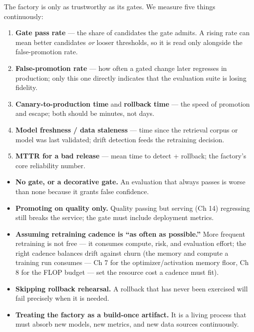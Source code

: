 The factory is only as trustworthy as its gates. We measure five things
continuously:

\begin{enumerate}
\def\labelenumi{\arabic{enumi}.}
\tightlist
\item
  \textbf{Gate pass rate} --- the share of candidates the gate admits. A
  rising rate can mean better candidates \emph{or} looser thresholds, so
  it is read only alongside the false-promotion rate.
\item
  \textbf{False-promotion rate} --- how often a gated change later
  regresses in production; only this one directly indicates that the
  evaluation suite is losing fidelity.
\item
  \textbf{Canary-to-production time} and \textbf{rollback time} --- the
  speed of promotion and escape; both should be minutes, not days.
\item
  \textbf{Model freshness / data staleness} --- time since the retrieval
  corpus or model was last validated; drift detection feeds the
  retraining decision.
\item
  \textbf{MTTR for a bad release} --- mean time to detect + rollback;
  the factory's core reliability number.
\end{enumerate}

\label{common-mistakes}


\begin{itemize}
\tightlist
\item
  \textbf{No gate, or a decorative gate.} An evaluation that always
  passes is worse than none because it grants false confidence.
\item
  \textbf{Promoting on quality only.} Quality passing but serving (Ch
  14) regressing still breaks the service; the gate must include
  deployment metrics.
\item
  \textbf{Assuming retraining cadence is ``as often as possible.''} More
  frequent retraining is not free --- it consumes compute, risk, and
  evaluation effort; the right cadence balances drift against churn (the
  memory and compute a training run consumes --- Ch 7 for the
  optimizer/activation memory floor, Ch 8 for the FLOP budget --- set
  the resource cost a cadence must fit).
\item
  \textbf{Skipping rollback rehearsal.} A rollback that has never been
  exercised will fail precisely when it is needed.
\item
  \textbf{Treating the factory as a build-once artifact.} It is a living
  process that must absorb new models, new metrics, and new data sources
  continuously.
\end{itemize}

